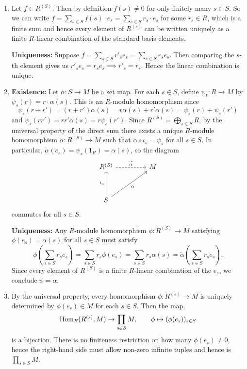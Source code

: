 \documentclass[Notebook.tex]{subfiles}
\begin{document}
    \begin{solution}
        \bbni 
        \begin{enumerate}
            \item Let $f \in R^{(S)}$. Then by definition $f(s) \neq 0$ for only finitely many $s \in S$. So we can write $f = \sum_{s \in S} f(s) \cdot e_s = \sum_{s \in S} r_s \cdot e_s$ for some $r_s \in R$, which is a finite sum and hence every element of $R^{(s)}$ can be written uniquely as a finite $R$-linear combination of the standard basis elements. 
            
            \textbf{Uniqueness:} Suppose $f = \sum_{s \in S} r'_s e_s = \sum_{s \in S} r_s e_s$. Then comparing the $s$-th element gives us $r'_s e_s = r_s e_s \implies r'_s = r_s$. Hence the linear combination is unique. 

            \item \textbf{Existence:} Let $\alpha: S \to M$ be a set map. For each $s \in S$, define $\psi_s: R \to M$ by $\psi_s(r) = r \cdot \alpha(s)$. This is an $R$-module homomorphism since
            \[
            \psi_s(r + r') = (r+r')\alpha(s) = r\alpha(s) + r'\alpha(s) = \psi_s(r) + \psi_s(r')
            \]
            and $\psi_s(rr') = rr'\alpha(s) = r\psi_s(r')$. Since $R^{(S)} = \bigoplus_{s \in S} R$, by the universal property of the direct sum there exists a unique $R$-module homomorphism $\widetilde{\alpha}: R^{(S)} \to M$ such that $\widetilde{\alpha} \circ \iota_s = \psi_s$ for all $s \in S$. In particular, $\widetilde{\alpha}(e_s) = \psi_s(1_R) = \alpha(s)$, so the diagram
            \[
            \begin{tikzcd}[row sep = 3.5em, column sep = 4.5em]
            R^{(S)} \arrow[r, dashed, "\widetilde{\alpha}"] & M\\
            S \arrow[u, "\iota_s"] \arrow[ur, swap, "\alpha"]&
            \end{tikzcd}
            \]
            commutes for all $s \in S$.

            \textbf{Uniqueness:} Any $R$-module homomorphism $\phi: R^{(S)} \to M$ satisfying $\phi(e_s) = \alpha(s)$ for all $s \in S$ must satisfy
            \[
            \phi\!\left(\sum_{s \in S} r_s e_s\right) = \sum_{s \in S} r_s \phi(e_s) = \sum_{s \in S} r_s \alpha(s) = \widetilde{\alpha}\!\left(\sum_{s \in S} r_s e_s\right).
            \]
            Since every element of $R^{(S)}$ is a finite $R$-linear combination of the $e_s$, we conclude $\phi = \widetilde{\alpha}$.


            \item By the universal property, every homomorphism $\phi: R^{(s)} \to M$ is uniquely determined by $\phi(e_s) \in M$ for each $s \in S$. Then the map, 
            \[\operatorname{Hom}_R(R^{(s)}, M) \to \prod_{s \in S} M, \qquad \phi \mapsto (\phi(e_s))_{s\in S}\]
            is a bijection. There is no finiteness restriction on how many $\phi(e_s) \neq 0$, hence the right-hand side must allow non-zero infinite tuples and hence is $\prod_{s\in S}M$. 



\end{enumerate}
\end{solution}
\end{document}
